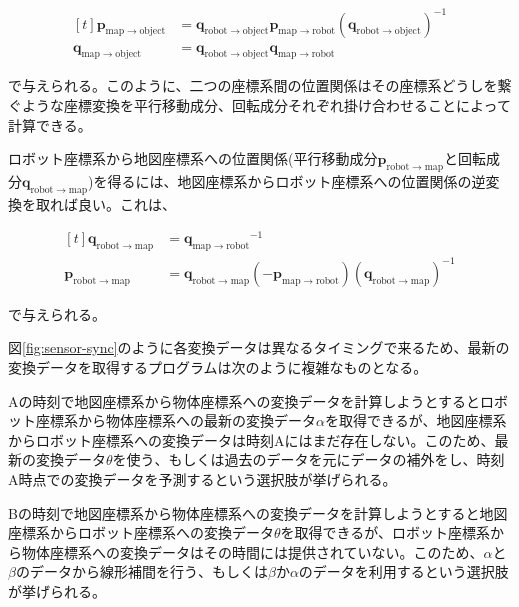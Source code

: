 \documentclass[a4paper]{jreport}	%
\begin{document}
\begin{equation}
\begin{aligned}[t]
	\mathbf{p}_{\mathrm{map \rightarrow object}} &= 
	\mathbf{q}_{\mathrm{robot \rightarrow object}}
	\mathbf{p}_{\mathrm{map \rightarrow robot}}
	(\mathbf{q}_{\mathrm{robot \rightarrow object}})^{-1} \\
	\mathbf{q}_{\mathrm{map \rightarrow object}} &= \mathbf{q}_{\mathrm{robot \rightarrow object}} 
	\mathbf{q}_{\mathrm{map \rightarrow  robot}}
\end{aligned}
\label{equation:cross}
\end{equation}

で与えられる。このように、二つの座標系間の位置関係はその座標系どうしを繋ぐような座標変換を平行移動成分、回転成分それぞれ掛け合わせることによって計算できる。

ロボット座標系から地図座標系への位置関係(平行移動成分$\mathbf{p}_{\mathrm{robot \rightarrow map}}$と回転成分$\mathbf{q}_{\mathrm{robot \rightarrow map}}$)を得るには、地図座標系からロボット座標系への位置関係の逆変換を取れば良い。これは、

\begin{equation}
\begin{aligned}[t]
	\mathbf{q}_{\mathrm{robot \rightarrow map}} &= {\mathbf{q}_{\mathrm{map \rightarrow robot}}}^{-1}
	\\
	\mathbf{p}_{\mathrm{robot \rightarrow map}} &= \mathbf{q}_{\mathrm{robot \rightarrow map}}(-\mathbf{p}_{\mathrm{map \rightarrow robot}})
	(\mathbf{q}_{\mathrm{robot \rightarrow map}})^{-1}
\end{aligned}
\label{equation:inv}
\end{equation}

で与えられる。


図\ref{fig:sensor-sync}のように各変換データは異なるタイミングで来るため、最新の変換データを取得するプログラムは次のように複雑なものとなる。

Aの時刻で地図座標系から物体座標系への変換データを計算しようとするとロボット座標系から物体座標系への最新の変換データ$\alpha$を取得できるが、地図座標系からロボット座標系への変換データは時刻Aにはまだ存在しない。このため、最新の変換データ$\theta$を使う、もしくは過去のデータを元にデータの補外をし、時刻A時点での変換データを予測するという選択肢が挙げられる。

Bの時刻で地図座標系から物体座標系への変換データを計算しようとすると地図座標系からロボット座標系への変換データ$\theta$を取得できるが、ロボット座標系から物体座標系への変換データはその時間には提供されていない。このため、$\alpha$と$\beta$のデータから線形補間を行う、もしくは$\beta$か$\alpha$のデータを利用するという選択肢が挙げられる。
\end{document}

